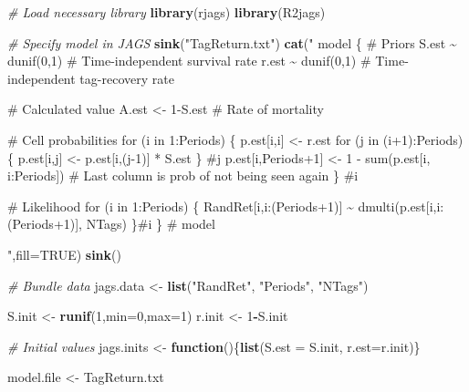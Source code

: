 \documentclass[
]{krantz}
\makeatletter
\newenvironment{Shaded}{\begin{snugshade}}{\end{snugshade}}
\newcommand{\AttributeTok}[1]{\textcolor[rgb]{0.27,0.27,0.27}{#1}}
\newcommand{\CommentTok}[1]{\textcolor[rgb]{0.37,0.37,0.37}{\textit{#1}}}
\newcommand{\ConstantTok}[1]{\textcolor[rgb]{0.37,0.37,0.37}{#1}}
\newcommand{\ControlFlowTok}[1]{\textcolor[rgb]{0.27,0.27,0.27}{\textbf{#1}}}
\newcommand{\DecValTok}[1]{\textcolor[rgb]{0.06,0.06,0.06}{#1}}
\newcommand{\FunctionTok}[1]{\textcolor[rgb]{0.27,0.27,0.27}{\textbf{#1}}}
\newcommand{\NormalTok}[1]{#1}
\newcommand{\OtherTok}[1]{\textcolor[rgb]{0.37,0.37,0.37}{#1}}
\newcommand{\SpecialCharTok}[1]{\textcolor[rgb]{0.43,0.43,0.43}{\textbf{#1}}}
\newcommand{\StringTok}[1]{\textcolor[rgb]{0.5,0.5,0.5}{#1}}
\newenvironment{kframe}{%
\medskip{}
\setlength{\fboxsep}{.8em}
 \def\at@end@of@kframe{}%
 \ifinner\ifhmode%
  \def\at@end@of@kframe{\end{minipage}}%
  \begin{minipage}{\columnwidth}%
 \fi\fi%
 \def\FrameCommand##1{\hskip\@totalleftmargin \hskip-\fboxsep
 \colorbox{shadecolor}{##1}\hskip-\fboxsep
     \hskip-\linewidth \hskip-\@totalleftmargin \hskip\columnwidth}%
 \MakeFramed {\advance\hsize-\width
   \@totalleftmargin\z@ \linewidth\hsize
   \@setminipage}}%
 {\par\unskip\endMakeFramed%
 \at@end@of@kframe}
\renewenvironment{Shaded}{\begin{kframe}}{\end{kframe}}
\makeatother
\begin{document}
\begin{Shaded}
\begin{Highlighting}[]
\CommentTok{\# Load necessary library}
\FunctionTok{library}\NormalTok{(rjags)}
\FunctionTok{library}\NormalTok{(R2jags)}

\CommentTok{\# Specify model in JAGS}
\FunctionTok{sink}\NormalTok{(}\StringTok{"TagReturn.txt"}\NormalTok{)}
\FunctionTok{cat}\NormalTok{(}\StringTok{"}
\StringTok{model \{}
\StringTok{  \# Priors}
\StringTok{  S.est \textasciitilde{} dunif(0,1) \# Time{-}independent survival rate}
\StringTok{  r.est \textasciitilde{} dunif(0,1) \# Time{-}independent tag{-}recovery rate}

\StringTok{  \# Calculated value}
\StringTok{  A.est \textless{}{-} 1{-}S.est \# Rate of mortality}

\StringTok{\# Cell probabilities}
\StringTok{for (i in 1:Periods) \{}
\StringTok{   p.est[i,i] \textless{}{-} r.est}
\StringTok{   for (j in (i+1):Periods) \{}
\StringTok{      p.est[i,j] \textless{}{-} p.est[i,(j{-}1)] * S.est}
\StringTok{      \} \#j}
\StringTok{    p.est[i,Periods+1] \textless{}{-} 1 {-} sum(p.est[i, i:Periods])}
\StringTok{    \# Last column is prob of not being seen again}
\StringTok{    \} \#i}

\StringTok{\# Likelihood}
\StringTok{  for (i in 1:Periods) \{}
\StringTok{    RandRet[i,i:(Periods+1)] \textasciitilde{} dmulti(p.est[i,i:(Periods+1)], NTags)}
\StringTok{    \}\#i}
\StringTok{ \} \# model}

\StringTok{"}\NormalTok{,}\AttributeTok{fill=}\ConstantTok{TRUE}\NormalTok{)}
\FunctionTok{sink}\NormalTok{()}

     \CommentTok{\# Bundle data}
\NormalTok{  jags.data }\OtherTok{\textless{}{-}} \FunctionTok{list}\NormalTok{(}\StringTok{"RandRet"}\NormalTok{, }\StringTok{"Periods"}\NormalTok{, }\StringTok{"NTags"}\NormalTok{)}

\NormalTok{  S.init }\OtherTok{\textless{}{-}} \FunctionTok{runif}\NormalTok{(}\DecValTok{1}\NormalTok{,}\AttributeTok{min=}\DecValTok{0}\NormalTok{,}\AttributeTok{max=}\DecValTok{1}\NormalTok{)}
\NormalTok{  r.init }\OtherTok{\textless{}{-}} \DecValTok{1}\SpecialCharTok{{-}}\NormalTok{S.init}

  \CommentTok{\# Initial values}
\NormalTok{  jags.inits }\OtherTok{\textless{}{-}} \ControlFlowTok{function}\NormalTok{()\{}\FunctionTok{list}\NormalTok{(}\AttributeTok{S.est =}\NormalTok{ S.init, }\AttributeTok{r.est=}\NormalTok{r.init)\}}

\NormalTok{  model.file }\OtherTok{\textless{}{-}} \StringTok{\textquotesingle{}TagReturn.txt\textquotesingle{}}


\end{Highlighting}
\end{Shaded}
\end{document}
